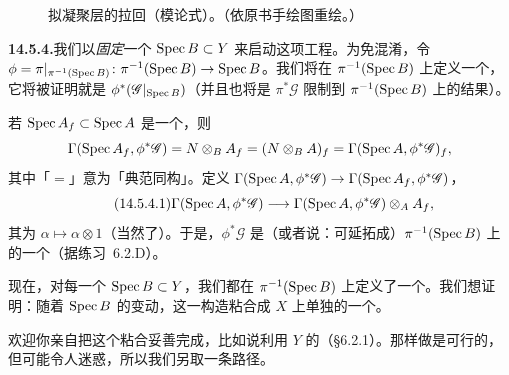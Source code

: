 \begin{figure}[htbp]
\centering
{}
\caption{拟凝聚层的拉回（模论式）。（依原书手绘图重绘。）}\label{fig:pullback-module-theoretic}
\end{figure}

\textbf{14.5.4.}\quad 我们以\emph{固定}一个\trAffine\trOpenSubset{} $\operatorname{Spec} B\subset Y$ 来启动这项工程。为免混淆，令 $\phi=\pi\vert_{\pi^{-1}(\operatorname{Spec} B)}\colon\pi^{-1}(\operatorname{Spec} B)\to\operatorname{Spec} B$。我们将在 $\pi^{-1}(\operatorname{Spec} B)$ 上定义一个\trQCSheaf，它将被证明就是 $\phi^*(\mathscr{G}\vert_{\operatorname{Spec} B})$（并且也将是 $\pi^*\mathscr{G}$ 限制到 $\pi^{-1}(\operatorname{Spec} B)$ 上的结果）。

若 $\operatorname{Spec} A_f\subset\operatorname{Spec} A$ 是一个\trDistinguishedOpen，则
\[
\Gamma(\operatorname{Spec} A_f,\phi^*\mathscr{G})=N\otimes_B A_f=(N\otimes_B A)_f=\Gamma(\operatorname{Spec} A,\phi^*\mathscr{G})_f,
\]
其中「$=$」意为「典范同构」。定义\trRestrictionMap{} $\Gamma(\operatorname{Spec} A,\phi^*\mathscr{G})\to\Gamma(\operatorname{Spec} A_f,\phi^*\mathscr{G})$，
\begin{equation*}\tag{14.5.4.1}\label{eq:restriction-map-affine-local}
\Gamma(\operatorname{Spec} A,\phi^*\mathscr{G})\longrightarrow\Gamma(\operatorname{Spec} A,\phi^*\mathscr{G})\otimes_A A_f,
\end{equation*}
其为 $\alpha\mapsto\alpha\otimes 1$（当然了）。于是，$\phi^*\mathscr{G}$ 是（或者说：可延拓成）$\pi^{-1}(\operatorname{Spec} B)$ 上的一个\trQCSheaf（据\mbox{练习~6.2.D}）。

现在，对每一个\trAffine\trOpenSubset{} $\operatorname{Spec} B\subset Y$，我们都在 $\pi^{-1}(\operatorname{Spec} B)$ 上定义了一个\trQCSheaf。我们想证明：随着 $\operatorname{Spec} B$ 的变动，这一构造粘合成 $X$ 上单独的一个\trQCSheaf。

欢迎你亲自把这个粘合妥善完成，比如说利用 $Y$ 的\trDistinguishedAffineBase（\S6.2.1）。那样做是可行的，但可能令人迷惑，所以我们另取一条路径。

